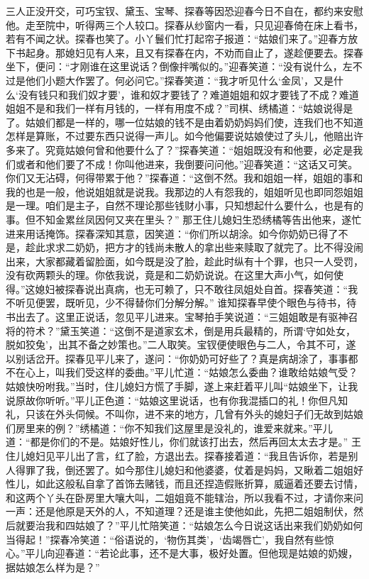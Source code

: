 \documentclass[12pt,oneside]{book}
\begin{document}
三人正没开交，可巧宝钗、黛玉、宝琴、探春等因恐迎春今日不自在，都约来安慰他。走至院中，听得两三个人较口。探春从纱窗内一看，只见迎春倚在床上看书，若有不闻之状。探春也笑了。小丫鬟们忙打起帘子报道：“姑娘们来了。”迎春方放下书起身。那媳妇见有人来，且又有探春在内，不劝而自止了，遂趁便要去。探春坐下，便问：“才刚谁在这里说话？倒像拌嘴似的。”迎春笑道：“没有说什么，左不过是他们小题大作罢了。何必问它。”探春笑道：“我才听见什么‘金凤’，又是什么‘没有钱只和我们奴才要’，谁和奴才要钱了？难道姐姐和奴才要钱了不成？难道姐姐不是和我们一样有月钱的，一样有用度不成？”司棋、绣橘道：“姑娘说得是了。姑娘们都是一样的，哪一位姑娘的钱不是由着奶奶妈妈们使，连我们也不知道怎样是算账，不过要东西只说得一声儿。如今他偏要说姑娘使过了头儿，他赔出许多来了。究竟姑娘何曾和他要什么了？”探春笑道：“姐姐既没有和他要，必定是我们或者和他们要了不成！你叫他进来，我倒要问问他。”迎春笑道：“这话又可笑。你们又无沾碍，何得带累于他？”探春道：“这倒不然。我和姐姐一样，姐姐的事和我的也是一般，他说姐姐就是说我。我那边的人有怨我的，姐姐听见也即同怨姐姐是一理。咱们是主子，自然不理论那些钱财小事，只知想起什么要什么，也是有的事。但不知金累丝凤因何又夹在里头？”
那王住儿媳妇生恐绣橘等告出他来，遂忙进来用话掩饰。探春深知其意，因笑道：“你们所以胡涂。如今你奶奶已得了不是，趁此求求二奶奶，把方才的钱尚未散人的拿出些来赎取了就完了。比不得没闹出来，大家都藏着留脸面，如今既是没了脸，趁此时纵有十个罪，也只一人受罚，没有砍两颗头的理。你依我说，竟是和二奶奶说说。在这里大声小气，如何使得。”这媳妇被探春说出真病，也无可赖了，只不敢往凤姐处自首。探春笑道：“我不听见便罢，既听见，少不得替你们分解分解。”
谁知探春早使个眼色与待书，待书出去了。这里正说话，忽见平儿进来。宝琴拍手笑说道：“三姐姐敢是有驱神召将的符术？”黛玉笑道：“这倒不是道家玄术，倒是用兵最精的，所谓‘守如处女，脱如狡兔’，出其不备之妙策也。”二人取笑。宝钗便使眼色与二人，令其不可，遂以别话岔开。探春见平儿来了，遂问：“你奶奶可好些了？真是病胡涂了，事事都不在心上，叫我们受这样的委曲。”平儿忙道：“姑娘怎么委曲？谁敢给姑娘气受？姑娘快吩咐我。”当时，住儿媳妇方慌了手脚，遂上来赶着平儿叫“姑娘坐下，让我说原故你听听。”平儿正色道：“姑娘这里说话，也有你我混插口的礼！你但凡知礼，只该在外头伺候。不叫你，进不来的地方，几曾有外头的媳妇子们无故到姑娘们房里来的例？”绣橘道：“你不知我们这屋里是没礼的，谁爱来就来。”平儿道：“都是你们的不是。姑娘好性儿，你们就该打出去，然后再回太太去才是。”
王住儿媳妇见平儿出了言，红了脸，方退出去。探春接着道：“我且告诉你，若是别人得罪了我，倒还罢了。如今那住儿媳妇和他婆婆，仗着是妈妈，又瞅着二姐姐好性儿，如此这般私自拿了首饰去赌钱，而且还捏造假账折算，威逼着还要去讨情，和这两个丫头在卧房里大嚷大叫，二姐姐竟不能辖治，所以我看不过，才请你来问一声：还是他原是天外的人，不知道理？还是谁主使他如此，先把二姐姐制伏，然后就要治我和四姑娘了？”平儿忙陪笑道：“姑娘怎么今日说这话出来我们奶奶如何当得起！”探春冷笑道：“俗语说的，‘物伤其类’，‘齿竭唇亡’，我自然有些惊心。”平儿向迎春道：“若论此事，还不是大事，极好处置。但他现是姑娘的奶嫂，据姑娘怎么样为是？”
\end{document}
